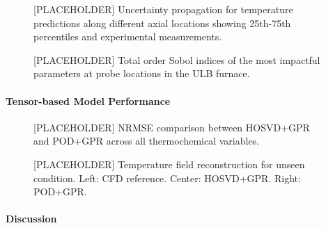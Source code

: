 \FloatBarrier
\begin{figure}[htbp]
    \centering
    \caption{[PLACEHOLDER] Uncertainty propagation for temperature predictions along different axial locations showing 25th-75th percentiles and experimental measurements.}
    \label{fig:ulb_uncertainty}
\end{figure}
\FloatBarrier


\FloatBarrier
\begin{figure}[htbp]
    \centering
    \caption{[PLACEHOLDER] Total order Sobol indices of the most impactful parameters at probe locations in the ULB furnace.}
    \label{fig:ulb_sobol}
\end{figure}
\FloatBarrier

\paragraph{Tensor-based Model Performance}


\FloatBarrier
\begin{figure}[htbp]
    \centering
    \caption{[PLACEHOLDER] NRMSE comparison between HOSVD+GPR and POD+GPR across all thermochemical variables.}
    \label{fig:ulb_nrmse}
\end{figure}
\FloatBarrier


\FloatBarrier
\begin{figure}[htbp]
    \centering
    \caption{[PLACEHOLDER] Temperature field reconstruction for unseen condition. Left: CFD reference. Center: HOSVD+GPR. Right: POD+GPR.}
    \label{fig:ulb_temp_reconstruction}
\end{figure}
\FloatBarrier

\paragraph{Discussion}

